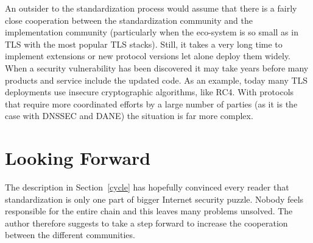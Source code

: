 \documentclass[peerreview, a4paper, 7pt]{IEEEtran}
\begin{document}
An outsider to the standardization process would assume that there is a fairly close cooperation between the standardization community and the implementation community (particularly when the eco-system is so small as in TLS with the most popular TLS stacks). Still, it takes a very long time to implement extensions or new protocol versions let alone deploy them widely. When a security vulnerability has been discovered it may take years before many products and service include the updated code. As an example, today many TLS deployments use insecure cryptographic algorithms, like RC4. With protocols that require more coordinated efforts by a large number of parties (as it is the case with DNSSEC and DANE) the situation is far more complex.  

\section{Looking Forward}

The description in Section~\ref{cycle} has hopefully convinced every reader that standardization is only one part of bigger Internet security puzzle. Nobody feels responsible for the entire chain and this leaves many problems unsolved. The author therefore suggests to take a step forward to increase the cooperation between the different communities. 
\end{document}
